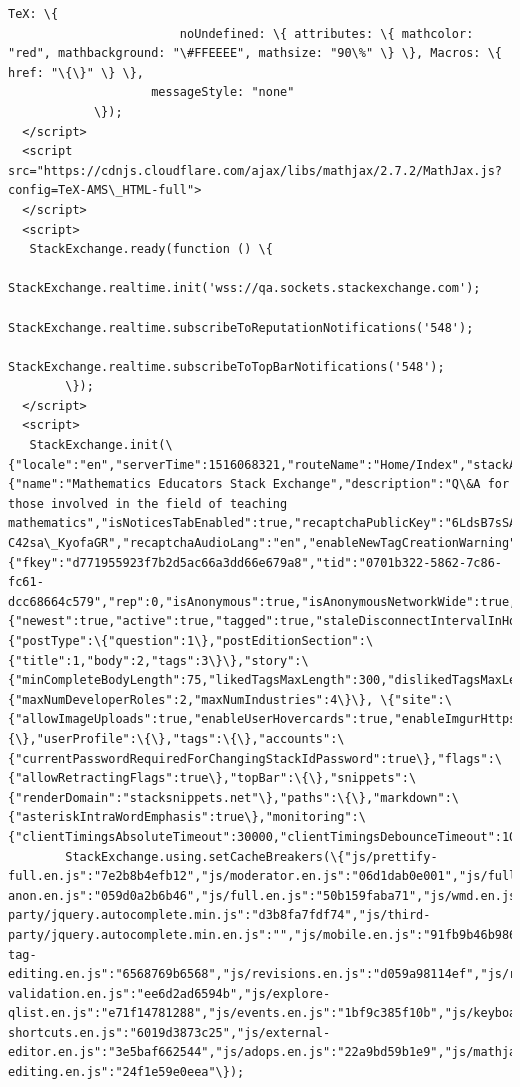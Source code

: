 \documentclass[11pt]{article}
\begin{document}
\begin{Verbatim}[commandchars=\\\{\}]
                    TeX: \{ 
                        noUndefined: \{ attributes: \{ mathcolor: "red", mathbackground: "\#FFEEEE", mathsize: "90\%" \} \}, Macros: \{ href: "\{\}" \} \},
                    messageStyle: "none"
            \});
  </script>
  <script src="https://cdnjs.cloudflare.com/ajax/libs/mathjax/2.7.2/MathJax.js?config=TeX-AMS\_HTML-full">
  </script>
  <script>
   StackExchange.ready(function () \{
            StackExchange.realtime.init('wss://qa.sockets.stackexchange.com');
            StackExchange.realtime.subscribeToReputationNotifications('548');
                StackExchange.realtime.subscribeToTopBarNotifications('548');
        \});
  </script>
  <script>
   StackExchange.init(\{"locale":"en","serverTime":1516068321,"routeName":"Home/Index","stackAuthUrl":"https://stackauth.com","networkMetaHostname":"meta.stackexchange.com","site":\{"name":"Mathematics Educators Stack Exchange","description":"Q\&A for those involved in the field of teaching mathematics","isNoticesTabEnabled":true,"recaptchaPublicKey":"6LdsB7sSAAAAAAzjgEF\_Hd8vXv-C42sa\_KyofaGR","recaptchaAudioLang":"en","enableNewTagCreationWarning":false,"insertSpaceAfterNameTabCompletion":false,"id":548,"childUrl":"https://matheducators.meta.stackexchange.com","enableSocialMediaInSharePopup":true,"protocol":"https"\},"user":\{"fkey":"d771955923f7b2d5ac66a3dd66e679a8","tid":"0701b322-5862-7c86-fc61-dcc68664c579","rep":0,"isAnonymous":true,"isAnonymousNetworkWide":true,"canSeeNewHeaderDesign":true\},"realtime":\{"newest":true,"active":true,"tagged":true,"staleDisconnectIntervalInHours":0,"workerIframeDomain":"https://cdn.sstatic.net"\},"events":\{"postType":\{"question":1\},"postEditionSection":\{"title":1,"body":2,"tags":3\}\},"story":\{"minCompleteBodyLength":75,"likedTagsMaxLength":300,"dislikedTagsMaxLength":300\},"jobPreferences":\{"maxNumDeveloperRoles":2,"maxNumIndustries":4\}\}, \{"site":\{"allowImageUploads":true,"enableUserHovercards":true,"enableImgurHttps":true,"forceHttpsImages":true\},"comments":\{\},"userProfile":\{\},"tags":\{\},"accounts":\{"currentPasswordRequiredForChangingStackIdPassword":true\},"flags":\{"allowRetractingFlags":true\},"topBar":\{\},"snippets":\{"renderDomain":"stacksnippets.net"\},"paths":\{\},"markdown":\{"asteriskIntraWordEmphasis":true\},"monitoring":\{"clientTimingsAbsoluteTimeout":30000,"clientTimingsDebounceTimeout":1000\}\});
        StackExchange.using.setCacheBreakers(\{"js/prettify-full.en.js":"7e2b8b4efb12","js/moderator.en.js":"06d1dab0e001","js/full-anon.en.js":"059d0a2b6b46","js/full.en.js":"50b159faba71","js/wmd.en.js":"2d1624a29c03","js/third-party/jquery.autocomplete.min.js":"d3b8fa7fdf74","js/third-party/jquery.autocomplete.min.en.js":"","js/mobile.en.js":"91fb9b46b986","js/help.en.js":"a9d821110060","js/tageditor.en.js":"4f83add90c55","js/tageditornew.en.js":"f96d3bb8fe70","js/inline-tag-editing.en.js":"6568769b6568","js/revisions.en.js":"d059a98114ef","js/review.en.js":"bf50f86e4b67","js/tagsuggestions.en.js":"d1ff9b84abe5","js/post-validation.en.js":"ee6d2ad6594b","js/explore-qlist.en.js":"e71f14781288","js/events.en.js":"1bf9c385f10b","js/keyboard-shortcuts.en.js":"6019d3873c25","js/external-editor.en.js":"3e5baf662544","js/adops.en.js":"22a9bd59b1e9","js/mathjax-editing.en.js":"24f1e59e0eea"\});

\end{Verbatim}
\end{document}
